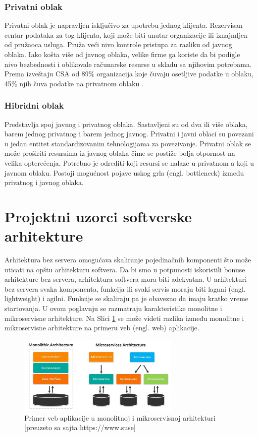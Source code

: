 \documentclass[12pt,oneside]{memoir}
\begin{document}
 
\subsubsection{Privatni oblak}
Privatni oblak je napravljen isključivo za upotrebu jednog klijenta. Rezervisan centar podataka za tog klijenta, koji može biti unutar organizacije ili iznajmljen od pružaoca usluga. Pruža veći nivo kontrole pristupa za razliku od javnog oblaka. Iako košta više od javnog oblaka, velike firme ga koriste da bi podigle nivo bezbednosti i oblikovale računarske resurse u skladu sa njihovim potrebama. Prema izveštaju CSA od 89\% organizacija koje čuvaju osetljive podatke u oblaku, 45\% njih čuva podatke na privatnom oblaku \cite{csa}.
 
\subsubsection{Hibridni oblak}
Predstavlja spoj javnog i privatnog oblaka. Sastavljeni su od dva ili više oblaka, barem jednog privatnog i barem jednog javnog. Privatni i javni oblaci su povezani u jedan entitet standardizovanim tehnologijama za povezivanje. Privatni oblak se može proširiti resursima iz javnog oblaka čime se postiže bolja otpornost na velika opterećenja. Potrebno je odrediti koji resursi se nalaze u privatnom a koji u javnom oblaku. Postoji mogućnost pojave uskog grla (engl. bottleneck) između privatnog i javnog oblaka.


\section{Projektni uzorci softverske arhitekture}
Arhitektura bez servera omogućava skaliranje pojedinačnih komponenti što može uticati na opštu arhitekturu softvera. Da bi smo u potpunosti iskoristili bonuse arhitekture bez servera, arhitektura softvera mora biti adekvatna. U arhitekturi bez servera svaka komponenta, funkcija ili svaki servis moraju biti lagani (engl. lightweight) i agilni. Funkcije se skaliraju pa je obavezno da imaju kratko vreme startovanja. U ovom poglavnju se razmatraju karakteristike monolitne i mikroservisne arhitekture. Na Slici \ref{fig:arhitekturniProjektniUzorci} se može videti razlika između monolitne i mikroservisne arhitekture na primeru veb (engl. web) aplikacije.

\begin{figure}[!ht]
  \centering
  \includegraphics[width=0.7\textwidth]{Slika 6.jpg}
  \caption{Primer veb aplikacije u monolitnoj i mikroservisnoj arhitekturi\\\footnotesize[preuzeto sa sajta https://www.suse]}
  \label{fig:arhitekturniProjektniUzorci}
\end{figure}
\end{document}
